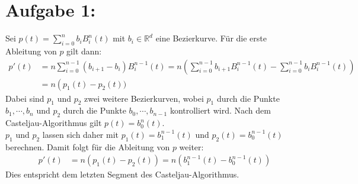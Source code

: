 \section*{Aufgabe 1: }
Sei $p(t) = \sum_{i=0}^nb_iB_i^n(t)$ mit $b_i \in \mathbb{R}^d$ eine Bezierkurve. Für die erste Ableitung von $p$ gilt dann:
\begin{align*}
  p'(t) &= n\sum_{i=0}^{n-1}(b_{i+1} - b_i)B_i^{n-1}(t) =n\left(\sum_{i=0}^{n-1}b_{i+1}B_i^{n-1}(t) - \sum_{i=0}^{n-1}b_iB_i^{n-1}(t)\right)\\
          &= n\left(p_1(t) - p_2(t))
\end{align*}
Dabei sind $p_1$ und $p_2$ zwei weitere Bezierkurven, wobei $p_1$ durch die Punkte $b_1,\cdots,b_n$ und $p_2$ durch die Punkte $b_0, \cdots, b_{n-1}$ kontrolliert wird. Nach dem Casteljau-Algorithmus gilt $p(t) = b_0^n(t)$.\\
$p_1$ und $p_2$ lassen sich daher mit $p_1(t) = b_1^{n-1}(t)$ und $p_2(t) = b_0^{n-1}(t)$ berechnen. Damit folgt für die Ableitung von $p$ weiter:
\begin{align*}
  p'(t) &= n\left(p_1(t) - p_2(t)\right) = n\left(b_1^{n-1}(t) - b_0^{n-1}(t)\right)
\end{align*}
Dies entspricht dem letzten Segment des Casteljau-Algorithmus.